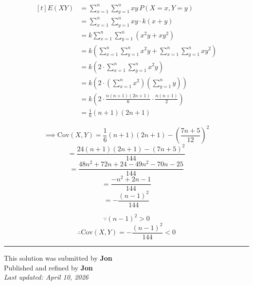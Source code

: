 ﻿\documentclass[12pt]{article}
\begin{document}
\[
\begin{aligned}[t]
E(XY)&=\sum_{x=1}^n \sum_{y=1}^n xy\,P(X=x,Y=y)\\
&=\sum_{x=1}^n \sum_{y=1}^n xy\cdot k(x+y)\\
&=k\sum_{x=1}^n \sum_{y=1}^n (x^2y+xy^2)\\
&=k\left(\sum_{x=1}^n \sum_{y=1}^n x^2y+\sum_{x=1}^n \sum_{y=1}^n xy^2\right)\\
&=k\left(2\cdot \sum_{x=1}^n \sum_{y=1}^n x^2y\right)\\
&=k\left(2\cdot \left(\sum_{x=1}^n x^2\right)\left(\sum_{y=1}^n y\right)\right)\\
&=k\left(2\cdot \frac{n(n+1)(2n+1)}{6}\cdot \frac{n(n+1)}{2}\right)\\
&=\frac{1}{6}(n+1)(2n+1)
\end{aligned}
\]



$$\implies\mathrm{Cov}(X,Y)=\frac{1}{6}(n+1)(2n+1)-\left(\frac{7n+5}{12}\right)^2$$
$$=\frac{24(n+1)(2n+1)-(7n+5)^2}{144}$$
$$=\frac{48n^2+72n+24-49n^2-70n-25}{144}$$
$$=\frac{-n^2+2n-1}{144}$$
$$=-\frac{(n-1)^2}{144}$$

$$\because (n-1)^2>0$$
$$\therefore \boxed{\mathrm{Cov}(X,Y)=-\frac{(n-1)^2}{144}<0}$$

\bigskip
\hrule

\begin{center}
    This solution was submitted by \textbf{Jon}\\[4pt]
    Published and refined by \textbf{Jon}\\[8pt]
	\textit{Last updated: April 10, 2026}
\end{center}
\end{document}
